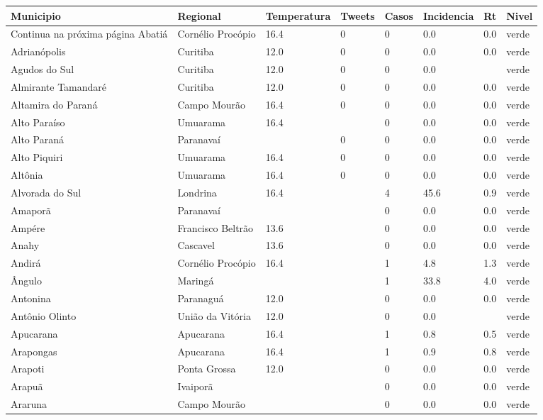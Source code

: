 \begin{longtable}{l|lllllll}
  \hline
Municipio & Regional & Temperatura & Tweets & Casos & Incidencia & Rt & Nivel \\ 
  \hline
\endhead
\hline
{\footnotesize Continua na próxima página}
\endfoot
\endlastfoot
Abatiá & Cornélio Procópio & 16.4 & 0 & 0 & 0.0 & 0.0 & verde \\ 
  Adrianópolis & Curitiba & 12.0 & 0 & 0 & 0.0 & 0.0 & verde \\ 
  Agudos do Sul & Curitiba & 12.0 & 0 & 0 & 0.0 &  & verde \\ 
  Almirante Tamandaré & Curitiba & 12.0 & 0 & 0 & 0.0 & 0.0 & verde \\ 
  Altamira do Paraná & Campo Mourão & 16.4 & 0 & 0 & 0.0 & 0.0 & verde \\ 
  Alto Paraíso & Umuarama & 16.4 &  & 0 & 0.0 & 0.0 & verde \\ 
  Alto Paraná & Paranavaí &  & 0 & 0 & 0.0 & 0.0 & verde \\ 
  Alto Piquiri & Umuarama & 16.4 & 0 & 0 & 0.0 & 0.0 & verde \\ 
  Altônia & Umuarama & 16.4 & 0 & 0 & 0.0 & 0.0 & verde \\ 
  Alvorada do Sul & Londrina & 16.4 &  & 4 & 45.6 & 0.9 & verde \\ 
  Amaporã & Paranavaí &  &  & 0 & 0.0 & 0.0 & verde \\ 
  Ampére & Francisco Beltrão & 13.6 &  & 0 & 0.0 & 0.0 & verde \\ 
  Anahy & Cascavel & 13.6 &  & 0 & 0.0 & 0.0 & verde \\ 
  Andirá & Cornélio Procópio & 16.4 &  & 1 & 4.8 & 1.3 & verde \\ 
  Ângulo & Maringá &  &  & 1 & 33.8 & 4.0 & verde \\ 
  Antonina & Paranaguá & 12.0 &  & 0 & 0.0 & 0.0 & verde \\ 
  Antônio Olinto & União da Vitória & 12.0 &  & 0 & 0.0 &  & verde \\ 
  Apucarana & Apucarana & 16.4 &  & 1 & 0.8 & 0.5 & verde \\ 
  Arapongas & Apucarana & 16.4 &  & 1 & 0.9 & 0.8 & verde \\ 
  Arapoti & Ponta Grossa & 12.0 &  & 0 & 0.0 & 0.0 & verde \\ 
  Arapuã & Ivaiporã &  &  & 0 & 0.0 & 0.0 & verde \\ 
  Araruna & Campo Mourão &  &  & 0 & 0.0 & 0.0 & verde \\ 

\end{longtable}
